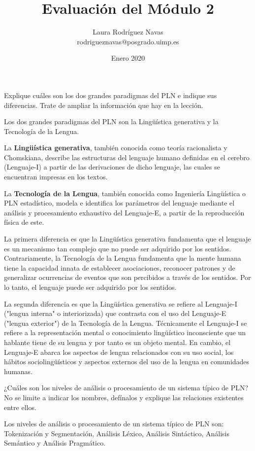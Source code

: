 \documentclass[11pt]{exam}
\title{Evaluación del Módulo 2}
\author{Laura Rodríguez Navas \\ rodrigueznavas@posgrado.uimp.es}
\date{Enero 2020}
\begin{document}
\maketitle

\begin{questions}
	
\question Explique cuáles son los dos grandes paradigmas del PLN e indique sus diferencias. Trate de ampliar la información que hay en la lección.

Los dos grandes paradigmas del PLN son la Lingüística generativa y la Tecnología de la Lengua.

La {\bf Lingüística generativa}, también conocida como teoría racionalista y Chomskiana, describe las estructuras del lenguaje humano definidas en el cerebro (Lenguaje-I) a partir de las derivaciones de dicho lenguaje, las cuales se encuentran
impresas en los textos.
	
La {\bf Tecnología de la Lengua}, también conocida como Ingeniería Lingüística o PLN estadístico, modela e identifica los parámetros del lenguaje mediante el análisis y procesamiento exhaustivo del Lenguaje-E, a partir de la reproducción física de este.

La primera diferencia es que la Lingüística generativa fundamenta que el lenguaje es un mecanismo tan complejo que no puede ser adquirido por los sentidos. Contrariamente, la Tecnología de la Lengua fundamenta que la mente humana tiene la capacidad innata de establecer asociaciones, reconocer patrones y de generalizar ocurrencias de eventos que son percibidos a través de los sentidos. Por lo tanto, el lenguaje puede ser adquirido por los sentidos.

La segunda diferencia es que la Lingüística generativa se refiere al Lenguaje-I ("lengua interna" o interiorizada) que contrasta con el uso del Lenguaje-E ("lengua exterior") de la Tecnología de la Lengua. Técnicamente el Lenguaje-I se refiere a la representación mental o conocimiento lingüístico inconsciente que un hablante tiene de su lengua y por tanto es un objeto mental. En cambio, el Lenguaje-E abarca los aspectos de lengua relacionados con su uso social, los hábitos sociolingüísticos y aspectos externos del uso de la lengua en comunidades humanas. 

\question ¿Cuáles son los niveles de análisis o procesamiento de un sistema típico de PLN? No se limite a indicar los nombres, defínalos y explique las relaciones existentes entre ellos.

Los niveles de análisis o procesamiento de un sistema típico de PLN son: Tokenización y Segmentación, Análisis Léxico, Análisis Sintáctico, Análisis Semántico y Análisis Pragmático.


\end{questions}
\end{document}
